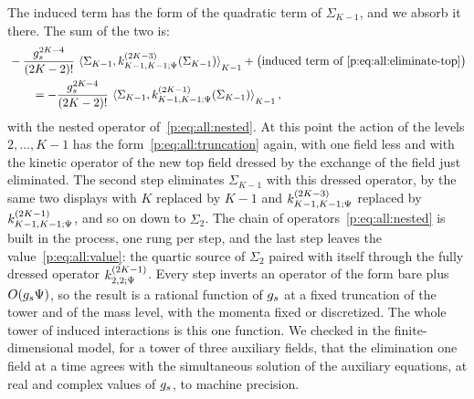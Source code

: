 The induced term has the form of the quadratic term of $\Sigma_{K - 1}$, and we absorb it there.
The sum of the two is:
\begin{equation}
  \label{p:eq:all:absorb}
  \begin{aligned}
    &
    - \frac{\gs^{2 K - 4}}{(2 K - 2)!} \, \pair[K - 1]{\Sigma_{K - 1}}{\kin{K - 1}{\Psi}{2 K - 3}(\Sigma_{K - 1})}
      + \big( \text{induced term of~\eqref{p:eq:all:eliminate-top}} \big)
    \\ &
    \qquad
    = - \frac{\gs^{2 K - 4}}{(2 K - 2)!} \, \pair[K - 1]{\Sigma_{K - 1}}{\kin{K - 1}{\Psi}{2 K - 1}(\Sigma_{K - 1})},
  \end{aligned}
\end{equation}
with the nested operator of~\eqref{p:eq:all:nested}.
At this point the action of the levels $2, \ldots, K - 1$ has the form~\eqref{p:eq:all:truncation} again, with one field less and with the kinetic operator of the new top field dressed by the exchange of the field just eliminated.
The second step eliminates $\Sigma_{K - 1}$ with this dressed operator, by the same two displays with $K$ replaced by $K - 1$ and $\kin{K - 1}{\Psi}{2 K - 3}$ replaced by $\kin{K - 1}{\Psi}{2 K - 1}$, and so on down to $\Sigma_2$.
The chain of operators~\eqref{p:eq:all:nested} is built in the process, one rung per step, and the last step leaves the value~\eqref{p:eq:all:value}: the quartic source of $\Sigma_2$ paired with itself through the fully dressed operator $\kin{2}{\Psi}{2 K - 1}$.
Every step inverts an operator of the form bare plus $O(g_s \Psi)$, so the result is a rational function of $g_s$ at a fixed truncation of the tower and of the mass level, with the momenta fixed or discretized.
The whole tower of induced interactions is this one function.
We checked in the finite-dimensional model, for a tower of three auxiliary fields, that the elimination one field at a time agrees with the simultaneous solution of the auxiliary equations, at real and complex values of $g_s$, to machine precision.

